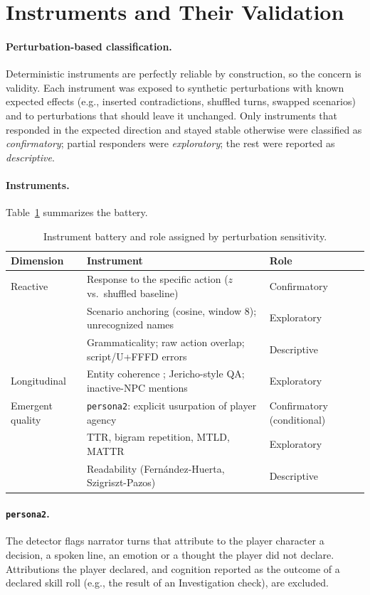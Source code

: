 \documentclass[11pt]{article}
\begin{document}
\section{Instruments and Their Validation}\label{sec:instruments}
\paragraph{Perturbation-based classification.} Deterministic instruments are perfectly reliable by construction, so the concern is validity. Each instrument was exposed to synthetic perturbations with known expected effects (e.g., inserted contradictions, shuffled turns, swapped scenarios) and to perturbations that should leave it unchanged. Only instruments that responded in the expected direction and stayed stable otherwise were classified as \emph{confirmatory}; partial responders were \emph{exploratory}; the rest were reported as \emph{descriptive}.

\paragraph{Instruments.} Table~\ref{tab:instr} summarizes the battery.
\begin{table}[t]\centering\small
\begin{tabular}{@{}lll@{}}\toprule
Dimension & Instrument & Role\\\midrule
Reactive & Response to the specific action ($z$ vs.\ shuffled baseline) & Confirmatory\\
 & Scenario anchoring (cosine, window 8); unrecognized names & Exploratory\\
 & Grammaticality; raw action overlap; script/U+FFFD errors & Descriptive\\
Longitudinal & Entity coherence \citep{papalampidi2022entities}; Jericho-style QA; inactive-NPC mentions & Exploratory\\
Emergent quality & \texttt{persona2}: explicit usurpation of player agency & Confirmatory (conditional)\\
 & TTR, bigram repetition, MTLD, MATTR & Exploratory\\
 & Readability (Fern\'andez-Huerta, Szigriszt-Pazos) & Descriptive\\\bottomrule
\end{tabular}
\caption{Instrument battery and role assigned by perturbation sensitivity.}\label{tab:instr}
\end{table}

\paragraph{\texttt{persona2}.} The detector flags narrator turns that attribute to the player character a decision, a spoken line, an emotion or a thought the player did not declare. Attributions the player declared, and cognition reported as the outcome of a declared skill roll (e.g., the result of an Investigation check), are excluded.
\end{document}
